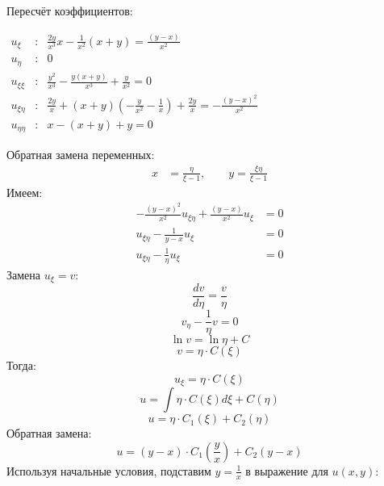 \documentclass[a4paper,12pt]{article}
\begin{document}
Пересчёт коэффициентов:
\begin{flushleft}
\(
\begin{array}{rcl}
u_{\xi} & : & \frac{2y}{x^3}x-\frac{1}{x^2}(x+y)= \frac{(y-x)}{x^2}\\
u_{\eta} & : & 0 \\
u_{\xi\xi} & : & \frac{y^2}{x^3}-\frac{y(x+y)}{x^3}+\frac{y}{x^2} = 0\\
u_{\xi\eta} & : &  \frac{2y}{x}+(x+y)(-\frac{y}{x^2} - \frac{1}{x}) + \frac{2y}{x} = -\frac{(y-x)^2}{x^2}\\
u_{\eta\eta} & : & x - (x+y) + y = 0
\end{array}
\)
\end{flushleft}
Обратная замена переменных:
\begin{align*}
    x &= \frac{\eta}{\xi - 1}, \quad \quad y = \frac{\xi\eta}{\xi - 1}
\end{align*}
Имеем:
\begin{align*}
    -\frac{(y-x)^2}{x^2}u_{\xi\eta} + \frac{(y-x)}{x^2}u_{\xi} &= 0 \\
    u_{\xi\eta} - \frac{1}{y - x}u_{\xi} &= 0 \\
    u_{\xi\eta} - \frac{1}{\eta}u_{\xi} &= 0
\end{align*}
Замена $u_{\xi}=v$:
\begin{equation*}
    \frac{dv}{d\eta} =\frac{v}{\eta}
\end{equation*}
\begin{equation*}
    v_{\eta} - \frac{1}{\eta}v = 0
\end{equation*}
\begin{equation*}
\ln v =\ln \eta + C
\end{equation*}
\begin{equation*}
v =\eta \cdot C(\xi)
\end{equation*}
Тогда:
\begin{equation*}
    u_{\xi} = \eta \cdot C(\xi)
\end{equation*}
\begin{equation*}
    u = \int \eta \cdot C(\xi) d\xi + C(\eta)
\end{equation*}
\begin{equation*}
    u = \eta \cdot C_1(\xi)+ C_2(\eta)
\end{equation*}
Обратная замена:
\begin{equation*}
    u = (y-x) \cdot C_1(\frac{y}{x})+ C_2(y-x)
\end{equation*}
Используя начальные условия, подставим $ y = \frac{1}{x} $ в выражение для $ u(x,y) $:
\end{document}
